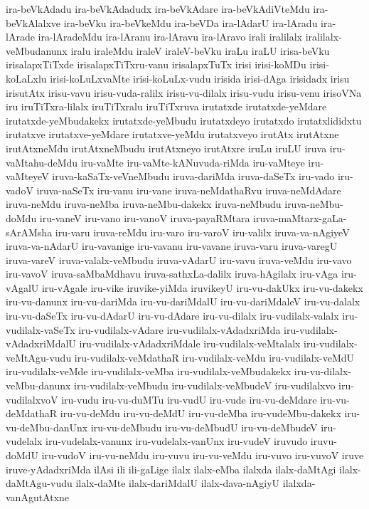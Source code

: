 {ira-beVkAdadu
ira-beVkAdadudx
ira-beVkAdare
ira-beVkAdiVteMdu
ira-beVkAlalxve
ira-beVku
ira-beVkeMdu
ira-beVDa
ira-lAdarU
ira-lAradu
ira-lArade
ira-lAradeMdu
ira-lAranu
ira-lAravu
ira-lAravo
irali
iralilalx
iralilalx-veMbudanunx
iralu
iraleMdu
iraleV
iraleV-beVku
iraLu
iraLU
irisa-beVku
irisalapxTiTxde
irisalapxTiTxru-vanu
irisalapxTuTx
irisi
irisi-koMDu
irisi-koLaLxlu
irisi-koLuLxvaMte
irisi-koLuLx-vudu
irisida
irisi-dAga
irisidadx
irisu
irisutAtx
irisu-vavu
irisu-vuda-ralilx
irisu-vu-dilalx
irisu-vudu
irisu-venu
irisoVNa
iru
iruTiTxra-lilalx
iruTiTxralu
iruTiTxruva
irutatxde
irutatxde-yeMdare
irutatxde-yeMbudakekx
irutatxde-yeMbudu
irutatxdeyo
irutatxdo
irutatxlididxtu
irutatxve
irutatxve-yeMdare
irutatxve-yeMdu
irutatxveyo
irutAtx
irutAtxne
irutAtxneMdu
irutAtxneMbudu
irutAtxneyo
irutAtxre
iruLu
iruLU
iruva
iru-vaMtahu-deMdu
iru-vaMte
iru-vaMte-kANuvuda-riMda
iru-vaMteye
iru-vaMteyeV
iruva-kaSaTx-veVneMbudu
iruva-dariMda
iruva-daSeTx
iru-vado
iru-vadoV
iruva-naSeTx
iru-vanu
iru-vane
iruva-neMdathaRvu
iruva-neMdAdare
iruva-neMdu
iruva-neMba
iruva-neMbu-dakekx
iruva-neMbudu
iruva-neMbu-doMdu
iru-vaneV
iru-vano
iru-vanoV
iruva-payaRMtara
iruva-maMtarx-gaLa-sArAMsha
iru-varu
iruva-reMdu
iru-varo
iru-varoV
iru-valilx
iruva-va-nAgiyeV
iruva-va-nAdarU
iru-vavanige
iru-vavanu
iru-vavane
iruva-varu
iruva-varegU
iruva-vareV
iruva-valalx-veMbudu
iruva-vAdarU
iru-vavu
iruva-veMdu
iru-vavo
iru-vavoV
iruva-saMbaMdhavu
iruva-sathxLa-dalilx
iruva-hAgilalx
iru-vAga
iru-vAgalU
iru-vAgale
iru-vike
iruvike-yiMda
iruvikeyU
iru-vu-dakUkx
iru-vu-dakekx
iru-vu-danunx
iru-vu-dariMda
iru-vu-dariMdalU
iru-vu-dariMdaleV
iru-vu-dalalx
iru-vu-daSeTx
iru-vu-dAdarU
iru-vu-dAdare
iru-vu-dilalx
iru-vudilalx-valalx
iru-vudilalx-vaSeTx
iru-vudilalx-vAdare
iru-vudilalx-vAdadxriMda
iru-vudilalx-vAdadxriMdalU
iru-vudilalx-vAdadxriMdale
iru-vudilalx-veMtalalx
iru-vudilalx-veMtAgu-vudu
iru-vudilalx-veMdathaR
iru-vudilalx-veMdu
iru-vudilalx-veMdU
iru-vudilalx-veMde
iru-vudilalx-veMba
iru-vudilalx-veMbudakekx
iru-vu-dilalx-veMbu-danunx
iru-vudilalx-veMbudu
iru-vudilalx-veMbudeV
iru-vudilalxvo
iru-vudilalxvoV
iru-vudu
iru-vu-duMTu
iru-vudU
iru-vude
iru-vu-deMdare
iru-vu-deMdathaR
iru-vu-deMdu
iru-vu-deMdU
iru-vu-deMba
iru-vudeMbu-dakekx
iru-vu-deMbu-danUnx
iru-vu-deMbudu
iru-vu-deMbudU
iru-vu-deMbudeV
iru-vudelalx
iru-vudelalx-vanunx
iru-vudelalx-vanUnx
iru-vudeV
iruvudo
iruvu-doMdU
iru-vudoV
iru-vu-neMdu
iru-vuvu
iru-vu-veMdu
iru-vuvo
iru-vuvoV
iruve
iruve-yAdadxriMda
ilAsi
ili
ili-gaLige
ilalx
ilalx-eMba
ilalxda
ilalx-daMtAgi
ilalx-daMtAgu-vudu
ilalx-daMte
ilalx-dariMdalU
ilalx-dava-nAgiyU
ilalxda-vanAgutAtxne
}
